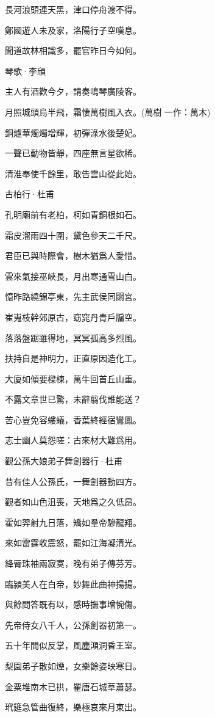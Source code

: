 \documentclass[12pt,a4paper]{ctexbook}
\begin{document}
長河浪頭連天黑，津口停舟渡不得。\par
鄭國遊人未及家，洛陽行子空嘆息。\par
聞道故林相識多，罷官昨日今如何。\par
琴歌·李頎\par
主人有酒歡今夕，請奏鳴琴廣陵客。\par
月照城頭烏半飛，霜悽萬樹風入衣。(萬樹 一作：萬木)\par
銅爐華燭燭增輝，初彈淥水後楚妃。\par
一聲已動物皆靜，四座無言星欲稀。\par
清淮奉使千餘里，敢告雲山從此始。\par
古柏行·杜甫\par
孔明廟前有老柏，柯如青銅根如石。\par
霜皮溜雨四十圍，黛色參天二千尺。\par
君臣已與時際會，樹木猶爲人愛惜。\par
雲來氣接巫峽長，月出寒通雪山白。\par
憶昨路繞錦亭東，先主武侯同閟宮。\par
崔嵬枝幹郊原古，窈窕丹青戶牖空。\par
落落盤踞雖得地，冥冥孤高多烈風。\par
扶持自是神明力，正直原因造化工。\par
大廈如傾要樑棟，萬牛回首丘山重。\par
不露文章世已驚，未辭翦伐誰能送？\par
苦心豈免容螻蟻，香葉終經宿鸞鳳。\par
志士幽人莫怨嗟：古來材大難爲用。\par
觀公孫大娘弟子舞劍器行·杜甫\par
昔有佳人公孫氏，一舞劍器動四方。\par
觀者如山色沮喪，天地爲之久低昂。\par
霍如羿射九日落，矯如羣帝驂龍翔。\par
來如雷霆收震怒，罷如江海凝清光。\par
絳脣珠袖兩寂寞，晚有弟子傳芬芳。\par
臨潁美人在白帝，妙舞此曲神揚揚。\par
與餘問答既有以，感時撫事增惋傷。\par
先帝侍女八千人，公孫劍器初第一。\par
五十年間似反掌，風塵澒洞昏王室。\par
梨園弟子散如煙，女樂餘姿映寒日。\par
金粟堆南木已拱，瞿唐石城草蕭瑟。\par
玳筵急管曲復終，樂極哀來月東出。\par
\end{document}
